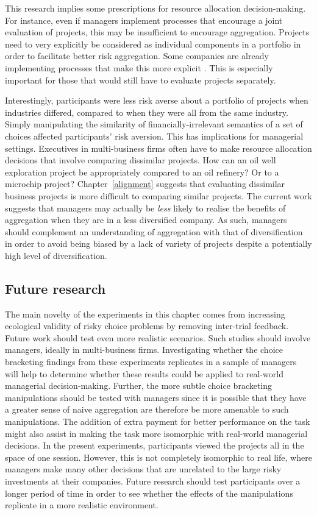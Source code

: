 \documentclass[a4paper, nobind, dvipsnames]{templates/ociamthesis}
\theoremstyle{definition}
\theoremstyle{definition}
\theoremstyle{definition}
\theoremstyle{definition}
\theoremstyle{remark}
\begin{document}
This research implies some prescriptions for resource allocation
decision-making. For instance, even if managers implement processes that
encourage a joint evaluation of projects, this may be insufficient to encourage
aggregation. Projects need to very explicitly be considered as individual
components in a portfolio in order to facilitate better risk aggregation. Some
companies are already implementing processes that make this more explicit
\autocite{lovallo2020}. This is especially important for those that would still have
to evaluate projects separately.

Interestingly, participants were less risk averse about a portfolio of projects
when industries differed, compared to when they were all from the same industry.
Simply manipulating the similarity of financially-irrelevant semantics of a set
of choices affected participants' risk aversion. This has implications for
managerial settings. Executives in multi-business firms often have to make
resource allocation decisions that involve comparing dissimilar projects. How
can an oil well exploration project be appropriately compared to an oil
refinery? Or to a microchip project? Chapter~\ref{alignment} suggests that
evaluating dissimilar business projects is more difficult to comparing similar
projects. The current work suggests that managers may actually be \emph{less} likely
to realise the benefits of aggregation when they are in a less diversified
company. As such, managers should complement an understanding of aggregation
with that of diversification in order to avoid being biased by a lack of variety
of projects despite a potentially high level of diversification.

\subsection{Future research}

The main novelty of the experiments in this chapter comes from increasing
ecological validity of risky choice problems by removing inter-trial feedback.
Future work should test even more realistic scenarios. Such studies should
involve managers, ideally in multi-business firms. Investigating whether the
choice bracketing findings from these experiments replicates in a sample of
managers will help to determine whether these results could be applied to
real-world managerial decision-making. Further, the more subtle choice
bracketing manipulations should be tested with managers since it is possible
that they have a greater sense of naive aggregation are therefore be more
amenable to such manipulations. The addition of extra payment for better
performance on the task might also assist in making the task more isomorphic
with real-world managerial decisions. In the present experiments, participants
viewed the projects all in the space of one session. However, this is not
completely isomorphic to real life, where managers make many other decisions
that are unrelated to the large risky investments at their companies. Future
research should test participants over a longer period of time in order to see
whether the effects of the manipulations replicate in a more realistic
environment.
\end{document}
